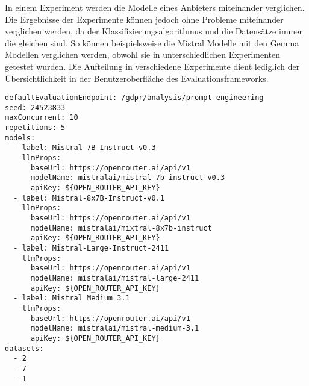 In einem Experiment werden die Modelle eines Anbieters miteinander verglichen. Die Ergebnisse der Experimente können jedoch ohne Probleme miteinander verglichen werden, da der Klassifizierungsalgorithmus und die Datensätze immer die gleichen sind. So können beispielsweise die Mistral Modelle mit den Gemma Modellen verglichen werden, obwohl sie in unterschiedlichen Experimenten getestet wurden. Die Aufteilung in verschiedene Experimente dient lediglich der Übersichtlichkeit in der Benutzeroberfläche des Evaluationsframeworks.

\begin{lstlisting}[caption={Konfigurationsdatei des Experiments mit Mistral Modellen}, label={lst:mistral-experiment-config}]
defaultEvaluationEndpoint: /gdpr/analysis/prompt-engineering
seed: 24523833
maxConcurrent: 10
repetitions: 5
models:
  - label: Mistral-7B-Instruct-v0.3
    llmProps:
      baseUrl: https://openrouter.ai/api/v1
      modelName: mistralai/mistral-7b-instruct-v0.3
      apiKey: ${OPEN_ROUTER_API_KEY}
  - label: Mistral-8x7B-Instruct-v0.1
    llmProps:
      baseUrl: https://openrouter.ai/api/v1
      modelName: mistralai/mixtral-8x7b-instruct
      apiKey: ${OPEN_ROUTER_API_KEY}
  - label: Mistral-Large-Instruct-2411
    llmProps:
      baseUrl: https://openrouter.ai/api/v1
      modelName: mistralai/mistral-large-2411
      apiKey: ${OPEN_ROUTER_API_KEY}
  - label: Mistral Medium 3.1
    llmProps:
      baseUrl: https://openrouter.ai/api/v1
      modelName: mistralai/mistral-medium-3.1
      apiKey: ${OPEN_ROUTER_API_KEY}
datasets:
  - 2
  - 7
  - 1
\end{lstlisting}
